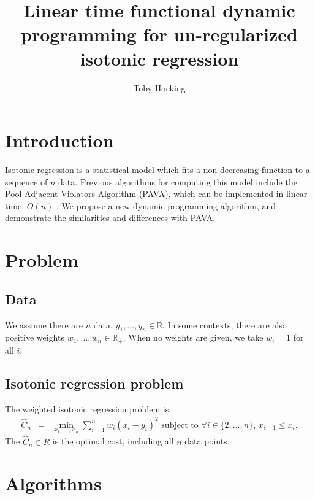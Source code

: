 \documentclass[12pt]{article}
\begin{document}
\author{Toby Hocking}

\title{Linear time functional dynamic programming for un-regularized isotonic regression}

\maketitle

\section{Introduction}

Isotonic regression is a statistical model which fits a non-decreasing function to a sequence of $n$ data.
Previous algorithms for computing this model include the Pool Adjacent Violators Algorithm (PAVA), which can be implemented in linear time, $O(n)$ \citep{Busing2022}.
We propose a new dynamic programming algorithm, and demonstrate the similarities and differences with PAVA.

\section{Problem}

\subsection{Data}

We assume there are $n$ data, $y_1,\dots,y_n\in \mathbb R$.
In some contexts, there are also positive weights $w_1,\dots,w_n\in \mathbb R_+$.
When no weights are given, we take $w_i=1$ for all $i$.

\subsection{Isotonic regression problem}

The weighted isotonic regression problem is 
\begin{eqnarray}
    \label{eq:isotonic-problem}
\hat C_n &= & \min_{x_1,\, \dots,\, x_{n}}  \sum_{i=1}^n w_i(x_i-y_i)^2 \text{ subject to } \forall i\in\{2, \dots, n\},\, x_{i-1} \leq x_{i}.
\end{eqnarray}
The $\hat C_n\in R$ is the optimal cost, including all $n$ data points.

\section{Algorithms}
\end{document}

